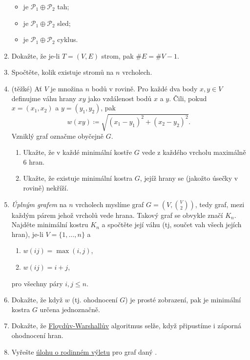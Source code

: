 \begin{enumerate}
\begin{itemize}
   \item je $\mathcal{P}_1 \oplus \mathcal{P}_2$ tah;
   \item je $\mathcal{P}_1 \oplus \mathcal{P}_2$ sled;
   \item je $\mathcal{P}_1 \oplus \mathcal{P}_2$ cyklus.
  \end{itemize}
 \item Dokažte, že je-li $T = (V,E)$ strom, pak $\# E = \# V - 1$.
 \item Spočtěte, kolik existuje stromů na $n$ vrcholech.
 \item (těžké) Ať $V$ je množina $n$ bodů v rovině. Pro každé dva body $x,y \in
  V$ definujme váhu hrany $xy$ jako vzdálenost bodů $x$ a $y$. Čili, pokud $x =
  (x_1,x_2)$ a $y = (y_1,y_2)$, pak
  \[
   w(xy) \coloneqq \sqrt{(x_1 - y_1)^2 + (x_2 - y_2)^2}.
  \]
  Vzniklý graf označme obyčejně $G$.
  \begin{enumerate}[label=(\alph*)]
   \item Ukažte, že v každé minimální kostře $G$ vede z každého vrcholu maximálně
    6 hran.
   \item Ukažte, že existuje minimální kostra $G$, jejíž hrany se (jakožto úsečky
    v rovině) nekříží.
  \end{enumerate}
 \item \emph{Úplným grafem} na $n$ vrcholech myslíme graf $G = (V,
  \binom{V}{2})$, tedy graf, mezi každým párem jehož vrcholů vede hrana. Takový
  graf se obvykle značí $K_n$. Najděte minimální kostru $K_n$ a spočtěte její
  váhu (tj, součet vah všech jejích hran), je-li $V = \{1,\ldots,n\}$ a
  \begin{enumerate}[label=(\alph*)]
   \item $w(ij) = \max(i,j)$,
   \item $w(ij) = i + j$,
  \end{enumerate}
  pro všechny páry $i,j \leq n$.
 \item Dokažte, že když $w$ (tj. ohodnocení $G$) je prosté zobrazení, pak je
  minimální kostra $G$ určena jednoznačně.
 \item Dokažte, že \hyperref[alg:floyd-warshall]{Floydův-Warshallův} algoritmus
  selže, když připustíme i záporná ohodnocení hran.
 \item Vyřešte \hyperref[prob:rodinny-vylet]{úlohu o rodinném výletu} pro graf
  daný .
\end{enumerate}
